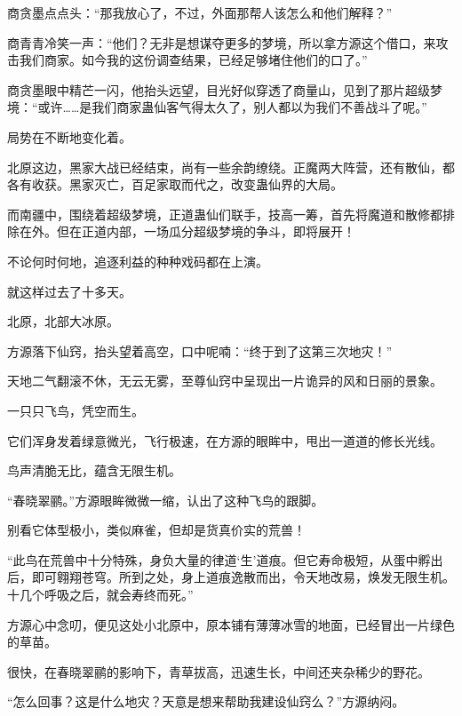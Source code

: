 \begin{this_body}
商贪墨点点头：“那我放心了，不过，外面那帮人该怎么和他们解释？”

商青青冷笑一声：“他们？无非是想谋夺更多的梦境，所以拿方源这个借口，来攻击我们商家。如今我的这份调查结果，已经足够堵住他们的口了。”

商贪墨眼中精芒一闪，他抬头远望，目光好似穿透了商量山，见到了那片超级梦境：“或许……是我们商家蛊仙客气得太久了，别人都以为我们不善战斗了呢。”

局势在不断地变化着。

北原这边，黑家大战已经结束，尚有一些余韵缭绕。正魔两大阵营，还有散仙，都各有收获。黑家灭亡，百足家取而代之，改变蛊仙界的大局。

而南疆中，围绕着超级梦境，正道蛊仙们联手，技高一筹，首先将魔道和散修都排除在外。但在正道内部，一场瓜分超级梦境的争斗，即将展开！

不论何时何地，追逐利益的种种戏码都在上演。

就这样过去了十多天。

北原，北部大冰原。

方源落下仙窍，抬头望着高空，口中呢喃：“终于到了这第三次地灾！”

天地二气翻滚不休，无云无雾，至尊仙窍中呈现出一片诡异的风和日丽的景象。

一只只飞鸟，凭空而生。

它们浑身发着绿意微光，飞行极速，在方源的眼眸中，甩出一道道的修长光线。

鸟声清脆无比，蕴含无限生机。

“春晓翠鹂。”方源眼眸微微一缩，认出了这种飞鸟的跟脚。

别看它体型极小，类似麻雀，但却是货真价实的荒兽！

“此鸟在荒兽中十分特殊，身负大量的律道‘生’道痕。但它寿命极短，从蛋中孵出后，即可翱翔苍穹。所到之处，身上道痕逸散而出，令天地改易，焕发无限生机。十几个呼吸之后，就会寿终而死。”

方源心中念叨，便见这处小北原中，原本铺有薄薄冰雪的地面，已经冒出一片绿色的草苗。

很快，在春晓翠鹂的影响下，青草拔高，迅速生长，中间还夹杂稀少的野花。

“怎么回事？这是什么地灾？天意是想来帮助我建设仙窍么？”方源纳闷。

\end{this_body}

